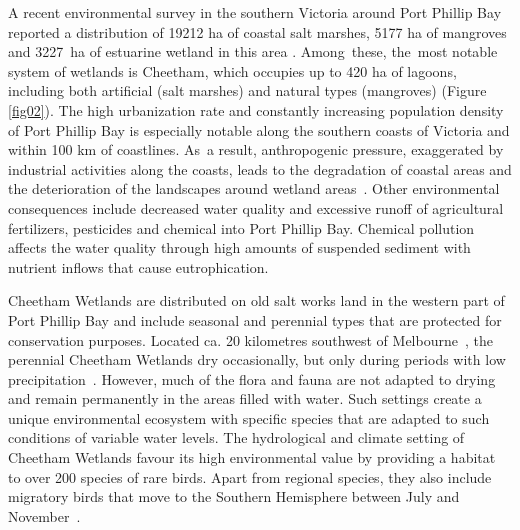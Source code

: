 \documentclass[jmse,article,accept,pdftex,oneauthor]{Definitions/mdpi}
\begin{document}
A {recent} environmental survey {in the southern Victoria around Port Phillip Bay }reported {a distribution of }19212 ha of coastal salt marshes, 5177 ha of mangroves and 3227~ha of estuarine wetland in {this area} \cite{Boon}. Among~these, the~most notable system of wetlands is Cheetham, which occupies up to 420 ha of lagoons, including both artificial (salt marshes) and natural types (mangroves) {(}Figure \ref{fig02}{)}. {The high urbanization rate and constantly increasing population density} of Port Phillip Bay {is especially notable along the southern} coasts of Victoria{ and }within 100 km of coastlines{. As~a result, anthropogenic} pressure, exaggerated by {industrial} activities along the coasts, {leads to the} degradation of coastal areas and the deterioration of the landscapes around wetland areas~\cite{land11020311}{. Other environmental consequences include decreased} water quality and {excessive} runoff of agricultural fertilizers, pesticides and chemical into Port Phillip Bay. {Chemical pollution }affects the water quality {through} high amounts of suspended sediment with nutrient inflows {that cause} eutrophication. 

Cheetham Wetlands are distributed on old salt works land in the western part of Port Phillip Bay and include seasonal and perennial {types} that are protected for conservation purposes. Located ca. 20 kilometres southwest of Melbourne~\cite{Westonetal2006}, the perennial Cheetham Wetlands dry occasionally, but only during periods with low precipitation~\cite{jmse9080898}. However, much of the flora and fauna are not adapted to drying and remain permanently in the areas filled with water. Such settings create a unique environmental ecosystem{ }with specific species that are adapted to such conditions of variable water levels. The hydrological and climate setting of Cheetham Wetlands favour its high environmental value by providing a habitat to over 200 species of rare birds{. Apart from regional species, they also include} migratory {birds} that {move} to the Southern Hemisphere between July and November~\cite{Jackson}. 
\end{document}

